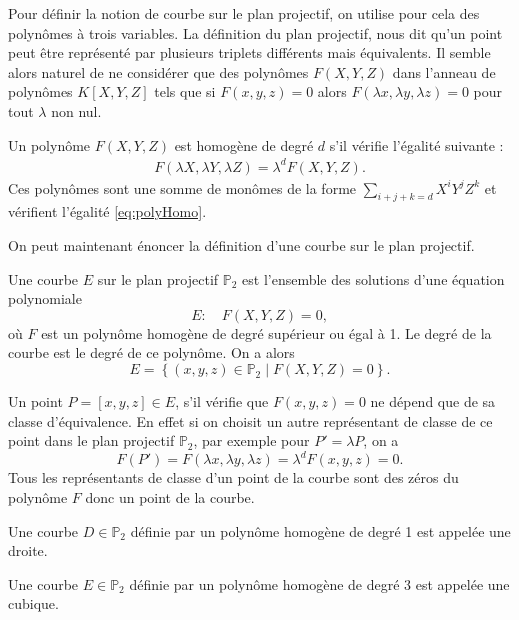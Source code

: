 Pour définir la notion de courbe sur le plan projectif, on utilise pour cela des polynômes à
trois variables. La définition du plan projectif, nous dit qu'un point peut être représenté par
plusieurs triplets différents mais équivalents. Il semble alors naturel de ne considérer
que des polynômes $F(X,Y,Z)$ dans l'anneau de polynômes $K[X,Y,Z]$ tels que si $F(x,y,z) = 0$ alors $F(\lambda x, \lambda
y, \lambda z) = 0$ pour tout $\lambda$ non nul.

\begin{definition}
    \label{polyHomo}
    
    Un polynôme $F(X,Y,Z)$ est homogène de degré $d$ s'il vérifie l'égalité suivante :
    \begin{align}
        \label{eq:polyHomo}
    F(\lambda X, \lambda Y, \lambda Z) = \lambda^{d}F(X,Y,Z)
    .\end{align}
    Ces polynômes sont une somme de monômes de la forme $\sum_{i+j+k=d} X^{i}Y^{j}Z^{k}$
    et vérifient l'égalité \eqref{eq:polyHomo}.
\end{definition}

On peut maintenant énoncer la définition d'une courbe sur le plan projectif.

\begin{definition}
    \label{def:courbeP2}
    Une courbe $E$ sur le plan projectif $\mathbb{P}_{2}$ est l'ensemble des solutions d'une
    équation polynomiale 
    \[
    E : \quad F(X,Y,Z)=0
    ,\] 
    où $F$ est un polynôme homogène de degré supérieur ou égal à 1. Le degré de la courbe
    est le degré de ce polynôme. On a alors 
    \[
    E = \left\{ (x,y,z) \in \mathbb{P}_{2} \mid F(X,Y,Z)=0 \right\} 
    .\] 
\end{definition}


Un point $P = [x,y,z] \in E$, s'il vérifie que $F(x,y,z)=0$ ne dépend que de sa classe
d'équivalence. En effet si on choisit un autre
représentant de classe de ce point dans le plan projectif $\mathbb{P}_{2}$, par exemple pour
$P'=\lambda P$, on a
\[
F(P')=F(\lambda x, \lambda y, \lambda z) = \lambda^{d}F(x,y,z) = 0
.\] 
Tous les représentants de classe d'un point de la courbe sont des zéros du polynôme $F$ donc un
point de la courbe.

\begin{definition}
    \label{def:cubique}
    
    Une courbe $D \in \mathbb{P}_{2}$ définie par un polynôme homogène de degré 1 est appelée
    une droite.

    Une courbe $E \in \mathbb{P}_{2}$ définie par un polynôme homogène de degré $3$ est appelée
    une cubique.
\end{definition}

